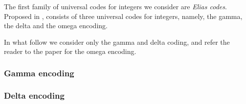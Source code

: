 \documentclass{subfiles}
\begin{document}
    The first family of universal codes for integers we consider are \emph{Elias codes}.
        Proposed in \cite{elias1975}, consists of three universal codes 
        for integers, namely, the gamma, the delta and the omega encoding.

    In what follow we consider only the gamma and delta coding, 
        and refer the reader to the paper for the omega encoding.

    \subsubsection{Gamma encoding}
    

    \subsubsection{Delta encoding}
    
\end{document}
